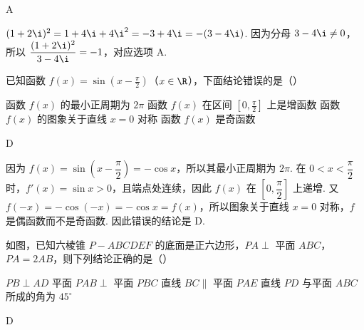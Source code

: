 \begin{answer}
A
\end{answer}

\begin{solution}
\((1+2\i)^2=1+4\i+4\i^2=-3+4\i=-(3-4\i)\). 因为分母 \(3-4\i\ne0\)，所以 \(\dfrac{(1+2\i)^2}{3-4\i}=-1\)，对应选项 A.
\end{solution}

\begin{problem}
已知函数 \(f(x) = \sin \left(x - \frac{\pi}{2}\right)\)（\(x \in \R\)），下面结论错误的是（\quad）

\choices
    {函数 \( f(x) \) 的最小正周期为 \( 2\pi \)}
    {函数 \( f(x) \) 在区间 \(\left[0, \frac{\pi}{2}\right]\) 上是增函数}
    {函数 \( f(x) \) 的图象关于直线 \( x = 0 \) 对称}
    {函数 \( f(x) \) 是奇函数}
\end{problem}

\begin{answer}
D
\end{answer}

\begin{solution}
因为 \(f(x)=\sin\left(x-\dfrac{\pi}{2}\right)=-\cos x\)，所以其最小正周期为 \(2\pi\). 在 \(0<x<\dfrac{\pi}{2}\) 时，\(f'(x)=\sin x>0\)，且端点处连续，因此 \(f(x)\) 在 \(\left[0,\dfrac{\pi}{2}\right]\) 上递增. 又 \(f(-x)=-\cos(-x)=-\cos x=f(x)\)，所以图象关于直线 \(x=0\) 对称，\(f\) 是偶函数而不是奇函数. 因此错误的结论是 D.
\end{solution}

\begin{problem}
如图，已知六棱锥 \(P - ABCDEF\) 的底面是正六边形，\(PA \perp\) 平面 \(ABC\)，\(PA = 2AB\)，则下列结论正确的是（\quad）


\choices
    {\(PB \perp AD\)}
    {平面 \(PAB \perp\) 平面 \(PBC\)}
    {直线 \(BC \parallel\) 平面 \(PAE\)}
    {直线 \(PD\) 与平面 \(ABC\) 所成的角为 \(45^{\circ}\)}
\end{problem}

\begin{answer}
D
\end{answer}

